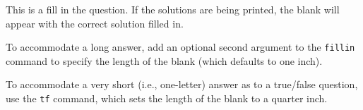 
This is a fill in the \fillin[blank] question. If the solutions are being
printed, the blank will appear with the correct solution filled in.

To accommodate a long answer, add an optional second argument to the
\texttt{fillin} command to specify the length of the blank (which defaults to
one inch).

To accommodate a very short (i.e., one-letter) answer as to a true/false
question, use the \texttt{tf} command, which sets the length of the blank to a
quarter inch.
